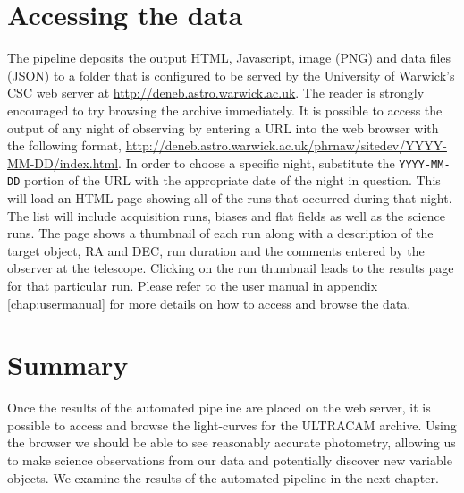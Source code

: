 \section{Accessing the data}
The pipeline deposits the output HTML, Javascript, image (PNG) and data files (JSON) to a folder that is configured to be served by the University of Warwick's CSC web server at \url{http://deneb.astro.warwick.ac.uk}. The reader is strongly encouraged to try browsing the archive immediately. It is possible to access the output of any night of observing by entering a URL into the web browser with the following format, \url{http://deneb.astro.warwick.ac.uk/phrnaw/sitedev/YYYY-MM-DD/index.html}. In order to choose a specific night, substitute the \texttt{YYYY-MM-DD} portion of the URL with the appropriate date of the night in question. This will load an HTML page showing all of the runs that occurred during that night. The list will include acquisition runs, biases and flat fields as well as the science runs. The page shows a thumbnail of each run along with a description of the target object, RA and DEC, run duration and the comments entered by the observer at the telescope. Clicking on the run thumbnail leads to the results page for that particular run. Please refer to the user manual in appendix \ref{chap:usermanual} for more details on how to access and browse the data.

\section{Summary}
Once the results of the automated pipeline are placed on the web server, it is  possible to access and browse the light-curves for the ULTRACAM archive. Using the browser we should be able to see reasonably accurate photometry, allowing us to make science observations from our data and potentially discover new variable objects. We examine the results of the automated pipeline in the next chapter. 

